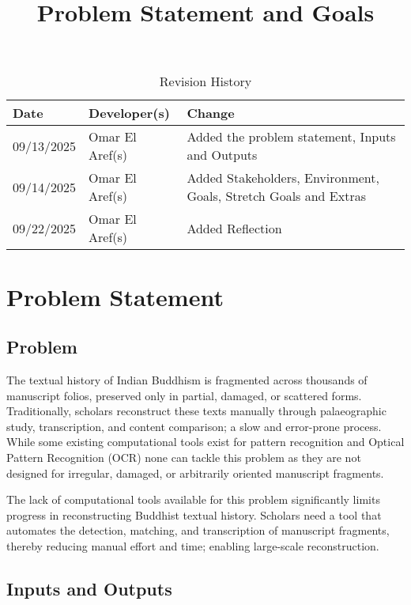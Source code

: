 \documentclass{article}
\title{Problem Statement and Goals\\\progname}
\author{\authname}
\date{}
\begin{document}
\maketitle

\begin{table}[hp]
\caption{Revision History} \label{TblRevisionHistory}
\begin{tabularx}{\textwidth}{llX}
\toprule
\textbf{Date} & \textbf{Developer(s)} & \textbf{Change}\\
\midrule
09/13/2025 & Omar El Aref(s) & Added the problem statement, Inputs and Outputs\\
09/14/2025 & Omar El Aref(s) & Added Stakeholders, Environment, Goals, Stretch Goals and Extras\\
09/22/2025 & Omar El Aref(s) & Added Reflection\\
\bottomrule
\end{tabularx}
\end{table}

\section{Problem Statement}

\subsection{Problem}
The textual history of Indian Buddhism is fragmented across thousands of manuscript folios, preserved only in partial, damaged, or scattered forms. Traditionally, scholars reconstruct these texts manually through palaeographic study, transcription, and content comparison; a slow and error-prone process. While some existing computational tools exist for pattern recognition and Optical Pattern Recognition (OCR) none can tackle this problem as they are not designed for irregular, damaged, or arbitrarily oriented manuscript fragments. 

The lack of computational tools available for this problem significantly limits progress in reconstructing Buddhist textual history. Scholars need a tool that automates the detection, matching, and transcription of manuscript fragments, thereby reducing manual effort and time; enabling large-scale reconstruction.

\subsection{Inputs and Outputs}
\end{document}
